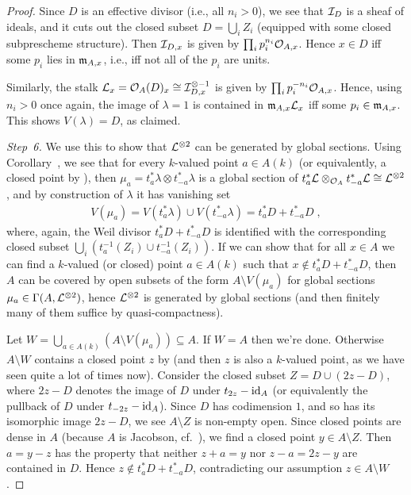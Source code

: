 \documentclass[a4paper,parskip=half,numbers=enddot, DIV=12]{scrreprt}
\begin{document}
\begin{proof}
	Since $D$ is an effective divisor (i.e., all $n_i>0$), we see that $\mathcal{I}_D$ is a sheaf of ideals, and it cuts out the closed subset $D=\bigcup_iZ_i$ (equipped with some closed subprescheme structure). Then $\mathcal{I}_{D,x}$ is given by $\prod_ip_i^{n_i}\mathcal{O}_{A,x}$. Hence $x\in D$ iff some $p_i$ lies in $\mathfrak{m}_{A,x}$, i.e., iff not all of the $p_i$ are units.
	
	Similarly, the stalk $\mathcal{L}_x=\mathcal{O}_A(D)_x\cong \mathcal{I}_{D,x}^{\otimes -1}$ is given by $\prod_ip_i^{-n_i}\mathcal{O}_{A,x}$. Hence, using $n_i>0$ once again, the image of $\lambda=1$ is contained in $\mathfrak{m}_{A,x}\mathcal{L}_x$ iff some $p_i\in \mathfrak{m}_{A,x}$. This shows $V(\lambda)=D$, as claimed.
	
	\emph{Step~6.} We use this to show that $\mathcal{L}^{\otimes 2}$ can be generated by global sections. Using Corollary~, we see that for every $k$-valued point $a\in A(k)$ (or equivalently, a closed point by ), then $\mu_a=t_a^*\lambda\otimes t_{-a}^*\lambda$ is a global section of $t_a^*\mathcal{L}\otimes_{\mathcal{O}_A}t_{-a}^*\mathcal{L}\cong \mathcal{L}^{\otimes 2}$, and by construction of $\lambda$ it has vanishing set 
	\begin{align*}
		V(\mu_a)=V(t_a^*\lambda)\cup V(t_{-a}^*\lambda)=t_a^*D+t_{-a}^*D\;,
	\end{align*}
	where, again, the Weil divisor $t_a^*D+t_{-a}^*D$ is identified with the corresponding closed subset $\bigcup_i(t_{a}^{-1}(Z_i)\cup t_{-a}^{-1}(Z_i))$. If we can show that for all $x\in A$ we can find a $k$-valued (or closed) point $a\in A(k)$ such that $x\notin t_a^*D+t_{-a}^*D$, then $A$ can be covered by open subsets of the form $A\setminus V(\mu_a)$ for global sections $\mu_a\in\Gamma(A,\mathcal{L}^{\otimes 2})$, hence $\mathcal{L}^{\otimes 2}$ is generated by global sections (and then finitely many of them suffice by quasi-compactness).
	
	Let $W=\bigcup_{a\in A(k)}(A\setminus V(\mu_a))\subseteq A$. If $W=A$ then we're done. Otherwise $A\setminus W$ contains a closed point $z$ by \cite[Proposition~2.1.1]{alggeo1} (and then $z$ is also a $k$-valued point, as we have seen quite a lot of times now). Consider the closed subset $Z=D\cup (2z-D)$, where $2z-D$ denotes the image of $D$ under $t_{2z}-\operatorname{id}_A$ (or equivalently the pullback of $D$ under $t_{-2z}-\operatorname{id}_A$). Since $D$ has codimension $1$, and so has its isomorphic image $2z-D$, we see $A\setminus Z$ is non-empty open. Since closed points are dense in $A$ (because $A$ is Jacobson, cf.\ \cite[Definition~2.4.2]{alggeo1}), we find a closed point $y\in A\setminus Z$. Then $a=y-z$ has the property that neither $z+a=y$ nor $z-a=2z-y$ are contained in $D$. Hence $z\notin t_a^*D+t_{-a}^*D$, contradicting our assumption $z\in A\setminus W$.
	

\end{proof}
\end{document}
